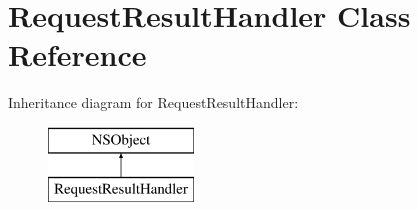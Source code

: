 \hypertarget{interface_request_result_handler}{}\section{Request\+Result\+Handler Class Reference}
\label{interface_request_result_handler}
Inheritance diagram for Request\+Result\+Handler\+:\begin{figure}[H]
\begin{center}
\leavevmode
\includegraphics[height=2.000000cm]{interface_request_result_handler}
\end{center}
\end{figure}
